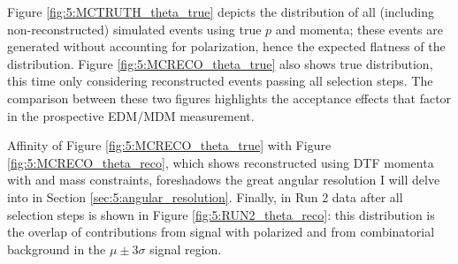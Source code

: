 Figure \ref{fig:5:MCTRUTH_theta_true} depicts the \cthetap distribution of all (including non-reconstructed) simulated \demonstratorshort events using true $p$ and \pim momenta;
these events are generated without accounting for \lz polarization, hence the expected flatness of the distribution.
Figure \ref{fig:5:MCRECO_theta_true} also shows true \cthetap distribution, this time only considering reconstructed events passing all selection steps. The comparison between these two figures highlights the acceptance effects that factor in the prospective \lz EDM/MDM measurement.

Affinity of Figure \ref{fig:5:MCRECO_theta_true} with Figure \ref{fig:5:MCRECO_theta_reco}, which shows reconstructed \cthetap using DTF momenta with \jpsi and \lz mass constraints, foreshadows the great angular resolution I will delve into in Section \ref{sec:5:angular_resolution}.
Finally, \cthetap in Run 2 data after all selection steps is shown in Figure \ref{fig:5:RUN2_theta_reco}:
this distribution is the overlap of contributions from \demonstratorshort signal with polarized \lz and from combinatorial background in the $\mu \pm 3\sigma$ signal region.


